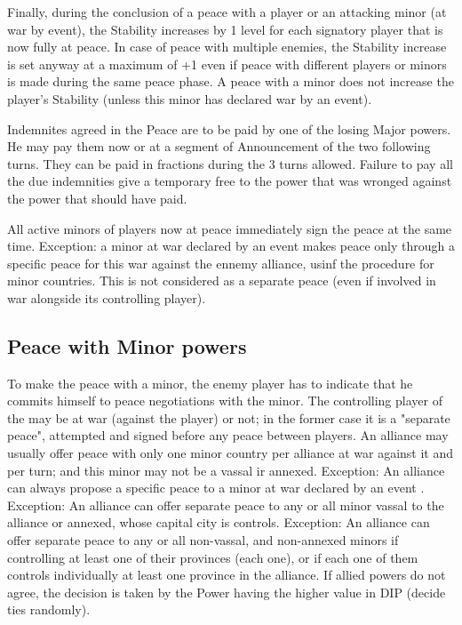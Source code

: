 Finally, during the conclusion of a peace with a player or an attacking minor
(at war by event), the Stability increases by 1 level for each signatory
player that is now fully at peace.
\bparag In case of peace with multiple enemies, the Stability increase is set
anyway at a maximum of +1 even if peace with different players or minors is
made during the same peace phase.
\bparag A peace with a minor does not increase the player's Stability (unless
this minor has declared war by an event).

\aparag[Indemnities] Indemnites agreed in the Peace are to be paid by one of
the losing Major powers. He may pay them now or at a segment of Announcement
of the two following turns. They can be paid in fractions during the 3 turns
allowed.
\bparag Failure to pay all the due indemnities give a temporary free \CB to
the power that was wronged against the power that should have paid.

All active minors of players now at peace immediately sign the peace at the
same time.
\bparag
Exception: a minor at war declared by an event makes peace only through a
specific peace for this war against the ennemy alliance, usinf the procedure
for minor countries.  This is not considered as a separate peace (even if
involved in war alongside its controlling player).



\subsection{Peace with Minor powers}

\aparag To make the peace with a minor, the enemy player has to indicate that
he commits himself to peace negotiations with the minor.  The controlling
player of the \MIN may be at war (against the player) or not; in the former
case it is a "separate peace", attempted and signed before any peace between
players.
\bparag An alliance may usually offer peace with only one minor country per
alliance at war against it and per turn; and this minor may not be a vassal ir
annexed.
\bparag Exception: An alliance can always propose a specific peace to a minor
at war declared by an event .
\bparag Exception: An alliance can offer separate peace to any or all minor
vassal to the alliance or annexed, whose capital city is controls.
\bparag Exception: An alliance can offer separate peace to any or all
non-vassal, and non-annexed minors if controlling at least one of their
provinces (each one), or if each one of them controls individually at least
one province in the alliance.
\bparag If allied powers do not agree, the decision is taken by the Power
having the higher value in DIP (decide ties randomly).

